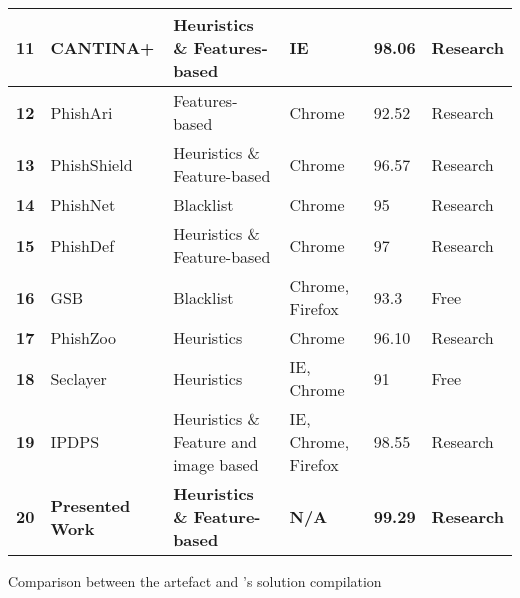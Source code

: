 \begin{center}
\begin{tabular}{ | m{0.9em} | m{7.6em} | m{13em} | m{7.1em} | m{2.3em} | m{4.3em} | }
		\hline
		\multicolumn{1}{|c|}{\textbf{11}} & CANTINA+                     & Heuristics \& Features-based          & IE                  & 98.06           & Research               \\
		\hline
		\multicolumn{1}{|c|}{\textbf{12}} & PhishAri                     & Features-based                        & Chrome              & 92.52           & Research               \\
		\hline
		\multicolumn{1}{|c|}{\textbf{13}} & PhishShield                  & Heuristics \& Feature-based           & Chrome              & 96.57           & Research               \\
		\hline
		\multicolumn{1}{|c|}{\textbf{14}} & PhishNet                     & Blacklist                             & Chrome              & 95              & Research               \\
		\hline
		\multicolumn{1}{|c|}{\textbf{15}} & PhishDef                     & Heuristics \& Feature-based           & Chrome              & 97              & Research               \\
		\hline
		\multicolumn{1}{|c|}{\textbf{16}} & GSB                          & Blacklist                             & Chrome, Firefox     & 93.3            & Free                   \\
		\hline
		\multicolumn{1}{|c|}{\textbf{17}} & PhishZoo                     & Heuristics                            & Chrome              & 96.10           & Research               \\
		\hline
		\multicolumn{1}{|c|}{\textbf{18}} & Seclayer                     & Heuristics                            & IE, Chrome          & 91              & Free                   \\
		\hline
		\multicolumn{1}{|c|}{\textbf{19}} & IPDPS                        & Heuristics \& Feature and image based & IE, Chrome, Firefox & 98.55           & Research               \\
        \hline
        \multicolumn{1}{|c|}{\textbf{20}}      & \textbf{Presented Work} & \textbf{Heuristics \& Feature-based} & \textbf{N/A}        & \textbf{99.29}  & \textbf{Research}      \\
		\hline
	\end{tabular}
    \captionsetup{type=table}\caption{Comparison between the artefact and \cite{Adebowale}'s solution compilation}
	\label{tab:EXISTENT_SOLUTIONS}
\end{center}

